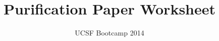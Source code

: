 \documentclass[twoside]{article}
\begin{document}
\title{Purification Paper Worksheet} \author{UCSF Bootcamp 2014}
\maketitle
\end{document}

